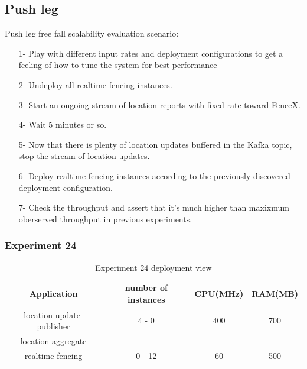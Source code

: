 \documentclass[a4]{report}
\begin{document}
    \subsection{Push leg}
    Push leg free fall scalability evaluation scenario:
    \begin{itemize}
        \item[1-] Play with different input rates and deployment configurations to get a feeling of how to tune the
        system for best performance
        \item[2-] Undeploy all realtime-fencing instances.
        \item[3-] Start an ongoing stream of location reports with fixed rate toward FenceX.
        \item[4-] Wait 5 minutes or so.
        \item[5-] Now that there is plenty of location updates buffered in the Kafka topic, stop the stream of
        location updates.
        \item[6-] Deploy realtime-fencing instances according to the previously discovered deployment configuration.
        \item[7-] Check the throughput and assert that it's much higher than maxixmum oberserved throughput in
        previous experiments.
    \end{itemize}

    \subsubsection{Experiment 24}
    \begin{table}[h!]
        \centering
        \begin{tabular}{|c|c|c|c|}
            \hline
            Application               & number of instances & CPU(MHz) & RAM(MB) \\
            \hline
            location-update-publisher & 4 - 0               & 400      & 700     \\
            location-aggregate        & -                   & -        & -       \\
            realtime-fencing          & 0 - 12              & 60       & 500     \\
            \hline
        \end{tabular}
        \caption{Experiment 24 deployment view}
        \label{table:ex24-dv}
    \end{table}
\end{document}
